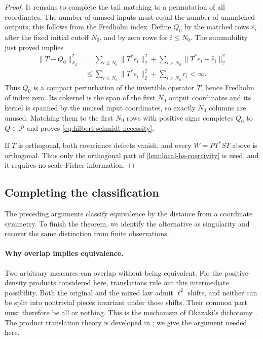 \begin{proof}
It remains to complete the tail matching to a permutation of all coordinates.
The number of unused inputs must equal the number of unmatched outputs;
this follows from the Fredholm index. Define $Q_0$ by the matched rows
$\widehat e_i$ after the fixed initial cutoff
$N_0$, and by zero rows for $i\leq N_0$.
The summability just proved implies
\[
 \begin{aligned}
 \|T-Q_0\|_{\mathcal S_2}^2
 &=\sum_{i\leq N_0}\|T^*e_i\|_2^2
                      +\sum_{i>N_0}\|T^*e_i-\widehat e_i\|_2^2\\
 &\leq\sum_{i\leq N_0}\|T^*e_i\|_2^2
       +\sum_{i>N_0}r_i<\infty.
 \end{aligned}
 \]
Thus $Q_0$ is a compact perturbation of the invertible operator $T$, hence
Fredholm of index zero.  Its cokernel is the span of the first $N_0$ output
coordinates and its kernel is spanned by the unused input coordinates, so
exactly $N_0$ columns are unused.  Matching them to the first $N_0$ rows with
positive signs completes $Q_0$ to $Q\in\mathcal P$ and proves
\eqref{eq:hilbert-schmidt-necessity}.

If $T$ is orthogonal, both covariance defects vanish, and every
$W=P T^*ST$ above is orthogonal.  Thus only the orthogonal part of
\cref{lem:local-hs-coercivity} is used, and it requires no scale Fisher
information.
\end{proof}

\subsection{Completing the classification}

The preceding arguments classify equivalence by the distance from a
coordinate symmetry. To finish the theorem, we identify the alternative
as singularity and recover the same distinction from finite observations.

\paragraph{Why overlap implies equivalence.}

Two arbitrary measures can overlap without being equivalent. For the
positive-density products considered here, translations rule out this
intermediate possibility. Both the original and the mixed law admit
\(\ell^2\) shifts, and neither can be split into nontrivial pieces invariant
under those shifts. Their common part must therefore be all or nothing.
This is the mechanism of Okazaki's dichotomy
\cite{okazaki1985dichotomy}. The product translation theory is developed in
\cite{shepp1965translate,hora1991quasi,sadasue2008quasi,arutyunyan2015spaces,honda2015approximations};
we give the argument needed here.

